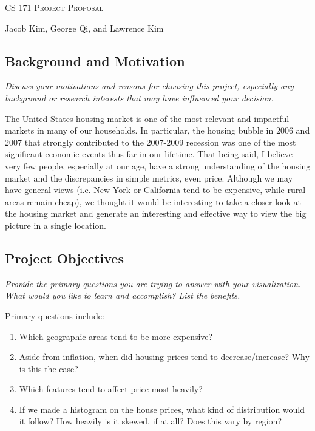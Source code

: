 \documentclass[12pt]{article}
\begin{document}
\begin{center}
{\Large \textsc{CS 171 Project Proposal}}

\bigskip

{\large Jacob Kim, George Qi, and Lawrence Kim}

\smallskip

\end{center}

\subsection*{Background and Motivation}
\vspace{-3mm}
{\it Discuss your motivations and reasons for choosing this project, especially any background or research interests that may have influenced your decision.}

The United States housing market is one of the most relevant and impactful markets in many of our households. In particular, the housing bubble in 2006 and 2007 that strongly contributed to the 2007-2009 recession was one of the most significant economic events thus far in our lifetime. That being said, I believe very few people, especially at our age, have a strong understanding of the housing market and the discrepancies in simple metrics, even price. Although we may have general views (i.e. New York or California tend to be expensive, while rural areas remain cheap), we thought it would be interesting to take a closer look at the housing market and generate an interesting and effective way to view the big picture in a single location.

\subsection*{Project Objectives}
\vspace{-3mm}
{\it Provide the primary questions you are trying to answer with your visualization. What would you like to learn and accomplish? List the benefits.}

Primary questions include:
\vspace{-3mm}
\begin{enumerate}
\item Which geographic areas tend to be more expensive?
\item Aside from inflation, when did housing prices tend to decrease/increase? Why is this the case?
\item Which features tend to affect price most heavily?
\item If we made a histogram on the house prices, what kind of distribution would it follow? How heavily is it skewed, if at all? Does this vary by region?
\end{enumerate}
\vspace{-1mm}
\end{document}
